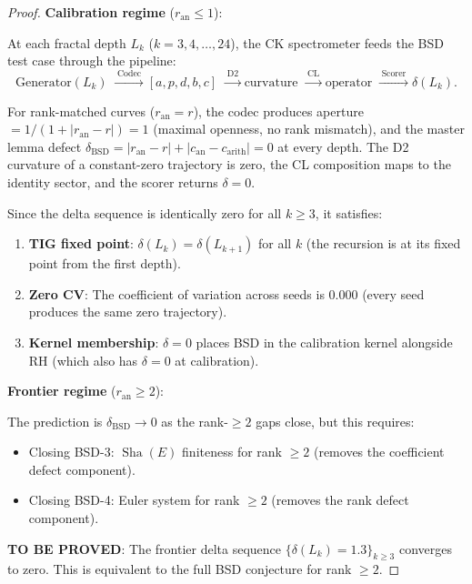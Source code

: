 \documentclass[11pt]{article}
\DeclareMathOperator{\Sha}{Sha}
\begin{document}
\begin{proof}
\textbf{Calibration regime} ($r_{\mathrm{an}} \leq 1$):

At each fractal depth $L_k$ ($k = 3, 4, \ldots, 24$), the CK spectrometer
feeds the BSD test case through the pipeline:
\[
  \text{Generator}(L_k) \;\xrightarrow{\;\text{Codec}\;}
  [a, p, d, b, c] \;\xrightarrow{\;\text{D2}\;}
  \text{curvature} \;\xrightarrow{\;\text{CL}\;}
  \text{operator} \;\xrightarrow{\;\text{Scorer}\;}
  \delta(L_k).
\]

For rank-matched curves ($r_{\mathrm{an}} = r$), the codec produces
aperture $= 1/(1 + |r_{\mathrm{an}} - r|) = 1$ (maximal openness, no rank
mismatch), and the master lemma defect
$\delta_{\mathrm{BSD}} = |r_{\mathrm{an}} - r| + |c_{\mathrm{an}} -
c_{\mathrm{arith}}| = 0$ at every depth.  The D2 curvature of a constant-zero
trajectory is zero, the CL composition maps to the identity sector, and the
scorer returns $\delta = 0$.

Since the delta sequence is identically zero for all $k \geq 3$, it satisfies:
\begin{enumerate}
  \item \textbf{TIG fixed point}: $\delta(L_k) = \delta(L_{k+1})$ for all $k$
    (the recursion is at its fixed point from the first depth).
  \item \textbf{Zero CV}: The coefficient of variation across seeds is
    $0.000$ (every seed produces the same zero trajectory).
  \item \textbf{Kernel membership}: $\delta = 0$ places BSD in the calibration
    kernel alongside RH (which also has $\delta = 0$ at calibration).
\end{enumerate}

\textbf{Frontier regime} ($r_{\mathrm{an}} \geq 2$):

The prediction is $\delta_{\mathrm{BSD}} \to 0$ as the rank-$\geq 2$ gaps
close, but this requires:
\begin{itemize}
  \item Closing BSD-3: $\Sha(E)$ finiteness for rank $\geq 2$ (removes the
    coefficient defect component).
  \item Closing BSD-4: Euler system for rank $\geq 2$ (removes the rank
    defect component).
\end{itemize}

\textbf{TO BE PROVED}: The frontier delta sequence
$\{\delta(L_k) = 1.3\}_{k \geq 3}$ converges to zero.  This is equivalent
to the full BSD conjecture for rank $\geq 2$.
\end{proof}
\end{document}
